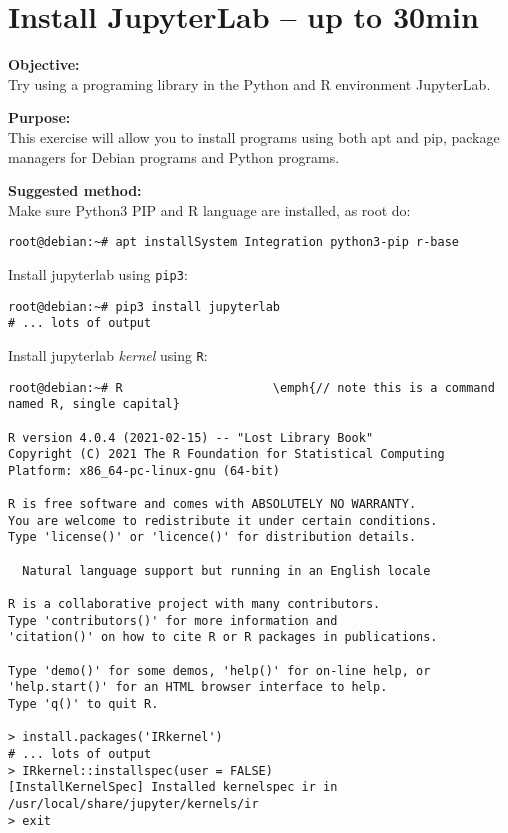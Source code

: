 \documentclass[a4paper,11pt,notitlepage]{report}
\begin{document}
\chapter{Install JupyterLab -- up to 30min}
\label{ex-python-Jupyterlab}


{\bf Objective:}\\
Try using a programing library in the Python and R environment JupyterLab.

{\bf Purpose:}\\
This exercise will allow you to install programs using both apt and pip, package managers for Debian programs and Python programs.

{\bf Suggested method:}\\
Make sure Python3 PIP and R language are installed, as root do:
\begin{verbatim}
root@debian:~# apt installSystem Integration python3-pip r-base
\end{verbatim}

Install jupyterlab using \verb+pip3+:
\begin{verbatim}
root@debian:~# pip3 install jupyterlab
# ... lots of output
\end{verbatim}

\eject

Install jupyterlab \emph{kernel} using \verb+R+:
\begin{verbatim}
root@debian:~# R                     \emph{// note this is a command named R, single capital}

R version 4.0.4 (2021-02-15) -- "Lost Library Book"
Copyright (C) 2021 The R Foundation for Statistical Computing
Platform: x86_64-pc-linux-gnu (64-bit)

R is free software and comes with ABSOLUTELY NO WARRANTY.
You are welcome to redistribute it under certain conditions.
Type 'license()' or 'licence()' for distribution details.

  Natural language support but running in an English locale

R is a collaborative project with many contributors.
Type 'contributors()' for more information and
'citation()' on how to cite R or R packages in publications.

Type 'demo()' for some demos, 'help()' for on-line help, or
'help.start()' for an HTML browser interface to help.
Type 'q()' to quit R.

> install.packages('IRkernel')
# ... lots of output
> IRkernel::installspec(user = FALSE)
[InstallKernelSpec] Installed kernelspec ir in /usr/local/share/jupyter/kernels/ir
> exit
\end{verbatim}
\end{document}

